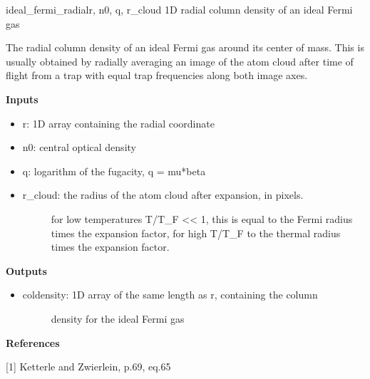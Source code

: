 \documentclass[letterpaper,10pt,english]{manual}
\begin{document}
\hypertarget{odysseus.fitfuncs.ideal_fermi_radial}{}\begin{funcdesc}{ideal\_fermi\_radial}{r, n0, q, r\_cloud}
1D radial column density of an ideal Fermi gas

The radial column density of an ideal Fermi gas around its center of mass.
This is usually obtained by radially averaging an image of the atom cloud
after time of flight from a trap with equal trap frequencies along both
image axes.

\textbf{Inputs}
\begin{itemize}
\item {} 
r: 1D array containing the radial coordinate

\item {} 
n0: central optical density

\item {} 
q: logarithm of the fugacity, q = mu*beta

\item {} \begin{description}
\item[r\_cloud: the radius of the atom cloud after expansion, in pixels.] \leavevmode
for low temperatures T/T\_F \textless{}\textless{} 1, this is equal to the
Fermi radius times the expansion factor, for high T/T\_F
to the thermal radius times the expansion factor.

\end{description}

\end{itemize}

\textbf{Outputs}
\begin{itemize}
\item {} \begin{description}
\item[coldensity: 1D array of the same length as r, containing the column] \leavevmode
density for the ideal Fermi gas

\end{description}

\end{itemize}

\textbf{References}

{[}1{]} Ketterle and Zwierlein, p.69, eq.65
\end{funcdesc}
\end{document}
